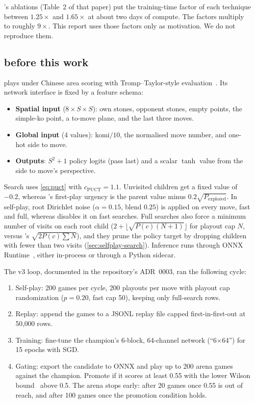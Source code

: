 \citeauthor{wu2019accelerating}'s ablations (Table~2 of that paper) put the training-time
factor of each technique between $1.25\times$ and $1.65\times$ at about two days of
compute. The factors multiply to roughly $9\times$. This report uses those factors only as
motivation. We do not reproduce them.

\subsection{\gofer{} before this work}\label{sec:bg-gofer}

\gofer{} plays under Chinese area scoring with Tromp--Taylor-style
evaluation~\citep{tromp2014go}. Its network interface is fixed by a feature schema:
\begin{itemize}
  \item \textbf{Spatial input} ($8\times S\times S$): own stones, opponent stones, empty
        points, the simple-ko point, a to-move plane, and the last three moves.
  \item \textbf{Global input} (4 values): komi$/10$, the normalised move number, and one-hot
        side to move.
  \item \textbf{Outputs}: $S^2+1$ policy logits (pass last) and a scalar $\tanh$ value from the
        side to move's perspective.
\end{itemize}

Search uses \cref{eq:puct} with $c_{\mathrm{PUCT}}=1.1$. Unvisited children get a fixed
value of $-0.2$, whereas \katago{}'s first-play urgency is the parent value minus
$0.2\sqrt{P_{\mathrm{explored}}}$. In self-play, root Dirichlet noise ($\alpha=0.15$, blend $0.25$) is applied on
every move, fast and full, whereas \katago{} disables it on fast searches. Full searches
also force a minimum number of visits on each root child ($2 + \lfloor\sqrt{P(c)(N+1)}\rfloor$
for playout cap $N$, versus \katago{}'s $\sqrt{2P(c)\sum N}$), and they prune the policy
target by dropping children with fewer than two visits (\cref{sec:selfplay-search}). Inference runs through ONNX
Runtime~\citep{onnxruntime2021}, either in-process or through a Python sidecar.

The v3 loop, documented in the repository's ADR~0003, ran the following cycle:
\begin{enumerate}
  \item Self-play: 200 games per cycle, 200 playouts per move with playout cap randomization
        ($p=0.20$, fast cap 50), keeping only full-search rows.
  \item Replay: append the games to a JSONL replay file capped first-in-first-out at 50{,}000
        rows.
  \item Training: fine-tune the champion's 6-block, 64-channel network (``6$\times$64'') for
        15 epochs with SGD.
  \item Gating: export the candidate to ONNX and play up to 200 arena games against the
        champion. Promote if it scores at least 0.55 with the lower Wilson
        bound~\citep{wilson1927probable} above 0.5. The arena stops early: after 20 games
        once 0.55 is out of reach, and after 100 games once the promotion condition holds.
\end{enumerate}

